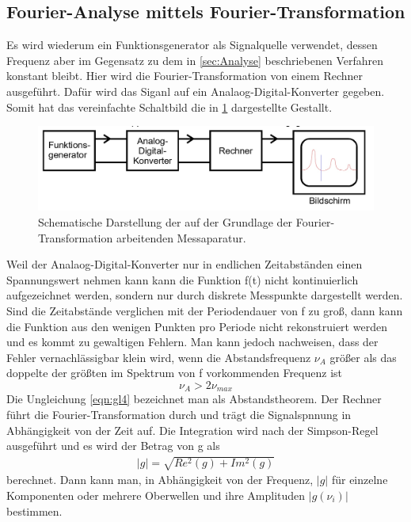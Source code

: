 \subsection{Fourier-Analyse mittels Fourier-Transformation}
\label{sec:Analyse durch Transormation}
Es wird wiederum ein Funktionsgenerator als Signalquelle verwendet, dessen Frequenz aber im Gegensatz zu dem in \ref{sec:Analyse} beschriebenen Verfahren konstant bleibt.
Hier wird die Fourier-Transformation von einem Rechner ausgeführt.
Dafür wird das Siganl auf ein Analaog-Digital-Konverter gegeben.
Somit hat das vereinfachte Schaltbild die in \ref{fig:abb3} dargestellte Gestallt.
\begin{figure}
  \centering
  \includegraphics[width=\textwidth]{abb3.jpg}
  \caption{Schematische Darstellung der auf der Grundlage der Fourier-Transformation arbeitenden Messaparatur.}
  \label{fig:abb3}
\end{figure}
Weil der Analaog-Digital-Konverter nur in endlichen Zeitabständen einen Spannungswert nehmen kann kann die Funktion f(t) nicht kontinuierlich aufgezeichnet werden,
sondern nur durch diskrete Messpunkte dargestellt werden.
Sind die Zeitabstände verglichen mit der Periodendauer von f zu groß, dann kann die Funktion aus den wenigen Punkten pro Periode nicht rekonstruiert werden und es kommt zu gewaltigen Fehlern.
Man kann jedoch nachweisen, dass der Fehler vernachlässigbar klein wird, wenn die Abstandsfrequenz $\nu_A$ größer als das doppelte der größten im Spektrum von f vorkommenden Frequenz ist
\begin{equation}
  \nu_A > 2 \nu_{max}
  \label{eqn:gl4}
\end{equation}
Die Ungleichung \ref{eqn:gl4} bezeichnet man als Abstandstheorem.
Der Rechner führt die Fourier-Transformation durch und trägt die Signalspnnung in Abhängigkeit von der Zeit auf.
Die Integration wird nach der Simpson-Regel ausgeführt und es wird der Betrag von g als 
\begin{align}
  |g| = \sqrt{Re^2 (g) + Im^2 (g)} 
\end{align}
berechnet.
Dann kann man, in Abhängigkeit von der Frequenz, $|g|$ für einzelne Komponenten oder mehrere Oberwellen und ihre Amplituden $|g(\nu_i)|$ bestimmen.